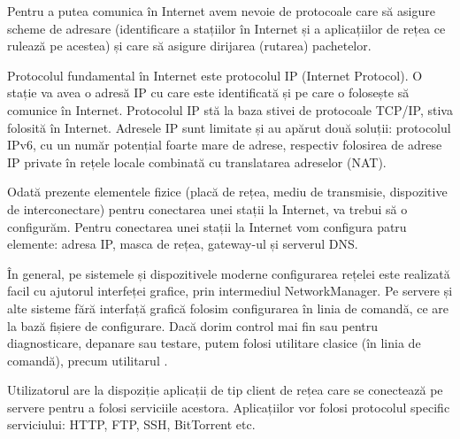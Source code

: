 Pentru a putea comunica în Internet avem nevoie de protocoale care să asigure scheme de adresare (identificare a stațiilor în Internet și a aplicațiilor de rețea ce rulează pe acestea) și care să asigure dirijarea (rutarea) pachetelor.

Protocolul fundamental în Internet este protocolul IP (Internet Protocol).
O stație va avea o adresă IP cu care este identificată și pe care o folosește să comunice în Internet.
Protocolul IP stă la baza stivei de protocoale TCP/IP, stiva folosită în Internet.
Adresele IP sunt limitate și au apărut două soluții: protocolul IPv6, cu un număr potențial foarte mare de adrese, respectiv folosirea de adrese IP private în rețele locale combinată cu translatarea adreselor (NAT).

Odată prezente elementele fizice (placă de rețea, mediu de transmisie, dispozitive de interconectare) pentru conectarea unei stații la Internet, va trebui să o configurăm.
Pentru conectarea unei stații la Internet vom configura patru elemente: adresa IP, masca de rețea, gateway-ul și serverul DNS.

În general, pe sistemele și dispozitivele moderne configurarea rețelei este realizată facil cu ajutorul interfeței grafice, prin intermediul NetworkManager.
Pe servere și alte sisteme fără interfață grafică folosim configurarea în linia de comandă, ce are la bază fișiere de configurare.
Dacă dorim control mai fin sau pentru diagnosticare, depanare sau testare, putem folosi utilitare clasice (în linia de comandă), precum utilitarul .

Utilizatorul are la dispoziție aplicații de tip client de rețea care se conectează pe servere pentru a folosi serviciile acestora.
Aplicațiilor vor folosi protocolul specific serviciului: HTTP, FTP, SSH, BitTorrent etc.
